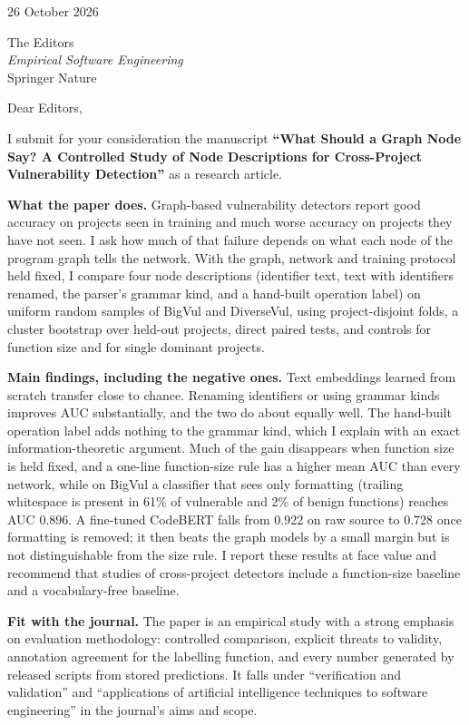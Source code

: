 \documentclass[11pt]{article}
\begin{document}
26 October 2026

The Editors\\
\emph{Empirical Software Engineering}\\
Springer Nature

Dear Editors,

I submit for your consideration the manuscript \textbf{``What Should a Graph Node
Say? A Controlled Study of Node Descriptions for Cross-Project Vulnerability
Detection''} as a research article.

\textbf{What the paper does.} Graph-based vulnerability detectors report good
accuracy on projects seen in training and much worse accuracy on projects they
have not seen. I ask how much of that failure depends on what each node of the
program graph tells the network. With the graph, network and training protocol
held fixed, I compare four node descriptions (identifier text, text with
identifiers renamed, the parser's grammar kind, and a hand-built operation
label) on uniform random samples of BigVul and DiverseVul, using
project-disjoint folds, a cluster bootstrap over held-out projects, direct
paired tests, and controls for function size and for single dominant projects.

\textbf{Main findings, including the negative ones.} Text embeddings learned
from scratch transfer close to chance. Renaming identifiers or using grammar
kinds improves AUC substantially, and the two do about equally well. The
hand-built operation label adds nothing to the grammar kind, which I explain
with an exact information-theoretic argument. Much of the gain disappears when
function size is held fixed, and a one-line function-size rule has a higher mean
AUC than every network, while on BigVul a classifier that sees only formatting
(trailing whitespace is present in 61\% of vulnerable and 2\% of benign
functions) reaches AUC 0.896. A fine-tuned CodeBERT falls from 0.922 on raw
source to 0.728 once formatting is removed; it then beats the graph models by a
small margin but is not distinguishable from the size rule. I report these results at face value and
recommend that studies of cross-project detectors include a function-size
baseline and a vocabulary-free baseline.

\textbf{Fit with the journal.} The paper is an empirical study with a strong
emphasis on evaluation methodology: controlled comparison, explicit threats to
validity, annotation agreement for the labelling function, and every number
generated by released scripts from stored predictions. It falls under
``verification and validation'' and ``applications of artificial intelligence
techniques to software engineering'' in the journal's aims and scope.
\end{document}
